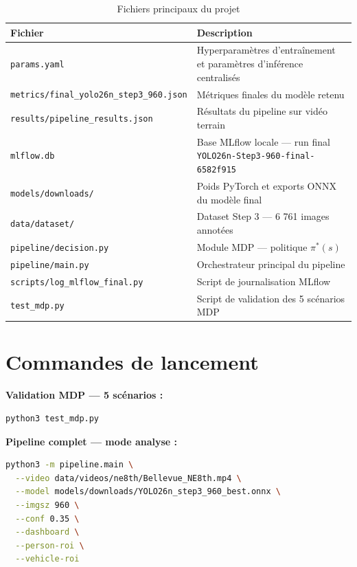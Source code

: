 \begin{table}[H]
\centering
\caption{Fichiers principaux du projet}
\small
\begin{tabularx}{\textwidth}{lX}
\toprule
\textbf{Fichier} & \textbf{Description} \\
\midrule
\texttt{params.yaml} &
Hyperparamètres d'entraînement et
paramètres d'inférence centralisés \\
\texttt{metrics/final\_yolo26n\_step3\_960.json} &
Métriques finales du modèle retenu \\
\texttt{results/pipeline\_results.json} &
Résultats du pipeline sur vidéo terrain \\
\texttt{mlflow.db} &
Base MLflow locale — run final
\texttt{YOLO26n-Step3-960-final-6582f915} \\
\texttt{models/downloads/} &
Poids PyTorch et exports ONNX du modèle
final \\
\texttt{data/dataset/} &
Dataset Step 3 — 6 761 images annotées \\
\texttt{pipeline/decision.py} &
Module MDP — politique $\pi^*(s)$ \\
\texttt{pipeline/main.py} &
Orchestrateur principal du pipeline \\
\texttt{scripts/log\_mlflow\_final.py} &
Script de journalisation MLflow \\
\texttt{test\_mdp.py} &
Script de validation des 5 scénarios MDP \\
\bottomrule
\end{tabularx}
\label{tab:artefacts}
\end{table}

\section*{Commandes de lancement}

\textbf{Validation MDP — 5 scénarios :}

\begin{lstlisting}[language=bash]
python3 test_mdp.py
\end{lstlisting}

\textbf{Pipeline complet — mode analyse :}

\begin{lstlisting}[language=bash]
python3 -m pipeline.main \
  --video data/videos/ne8th/Bellevue_NE8th.mp4 \
  --model models/downloads/YOLO26n_step3_960_best.onnx \
  --imgsz 960 \
  --conf 0.35 \
  --dashboard \
  --person-roi \
  --vehicle-roi
\end{lstlisting}

